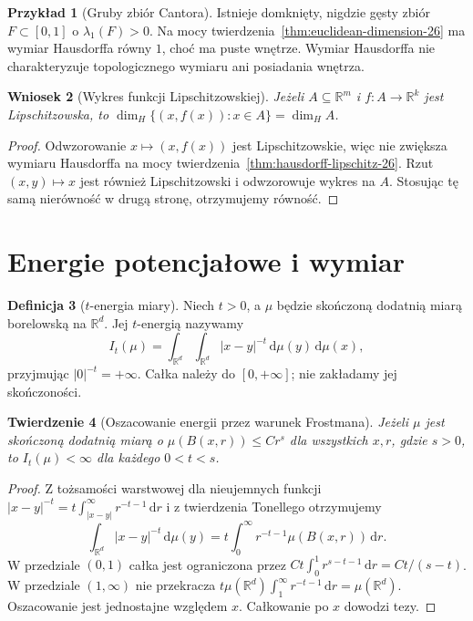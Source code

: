 \documentclass[11pt,a4paper,oneside]{book}
\numberwithin{equation}{chapter}
\theoremstyle{plain}
\newtheorem{twierdzenie}{Twierdzenie}[chapter]
\newtheorem{wniosek}[twierdzenie]{Wniosek}
\theoremstyle{definition}
\newtheorem{definicja}[twierdzenie]{Definicja}
\newtheorem{przyklad}[twierdzenie]{Przykład}
\theoremstyle{remark}
\begin{document}
\begin{przyklad}[Gruby zbiór Cantora]
Istnieje domknięty, nigdzie gęsty zbiór
$F\subset[0,1]$ o $\lambda_1(F)>0$.
Na mocy twierdzenia~\ref{thm:euclidean-dimension-26}
ma wymiar Hausdorffa równy $1$, choć ma puste wnętrze.
Wymiar Hausdorffa nie charakteryzuje topologicznego
wymiaru ani posiadania wnętrza.
\end{przyklad}

\begin{wniosek}[Wykres funkcji Lipschitzowskiej]
\label{cor:graph-dimension-26}
Jeżeli $A\subseteq\mathbb R^m$ i
$f:A\to\mathbb R^k$ jest Lipschitzowska, to
$\dim_H\{(x,f(x)):x\in A\}=\dim_HA$.
\end{wniosek}
\begin{proof}
Odwzorowanie $x\mapsto(x,f(x))$ jest Lipschitzowskie,
więc nie zwiększa wymiaru Hausdorffa na mocy
twierdzenia~\ref{thm:hausdorff-lipschitz-26}.
Rzut $(x,y)\mapsto x$ jest również Lipschitzowski
i odwzorowuje wykres na $A$. Stosując tę samą
nierówność w drugą stronę, otrzymujemy równość.
\end{proof}

\section{Energie potencjałowe i wymiar}
\begin{definicja}[$t$-energia miary]
\label{def:energy-26}
Niech $t>0$, a $\mu$ będzie skończoną dodatnią miarą
borelowską na $\mathbb R^d$. Jej $t$-energią nazywamy
\[
 I_t(\mu)=\int_{\mathbb R^d}\!\int_{\mathbb R^d}
 |x-y|^{-t}\,\mathrm d\mu(y)\,\mathrm d\mu(x),
\]
przyjmując $|0|^{-t}=+\infty$. Całka należy do
$[0,+\infty]$; nie zakładamy jej skończoności.
\end{definicja}

\begin{twierdzenie}[Oszacowanie energii przez warunek Frostmana]
\label{thm:frostman-energy-26}
Jeżeli $\mu$ jest skończoną dodatnią miarą o
$\mu(B(x,r))\le Cr^s$ dla wszystkich $x,r$,
gdzie $s>0$, to $I_t(\mu)<\infty$ dla każdego
$0<t<s$.
\end{twierdzenie}
\begin{proof}
Z tożsamości warstwowej dla nieujemnych funkcji
$|x-y|^{-t}=t\int_{|x-y|}^{\infty}r^{-t-1}\,\mathrm dr$
i z twierdzenia Tonellego otrzymujemy
\[
 \int_{\mathbb R^d}|x-y|^{-t}\,\mathrm d\mu(y)
 =t\int_0^\infty r^{-t-1}\mu(B(x,r))\,\mathrm dr.
\]
W przedziale $(0,1)$ całka jest ograniczona przez
$Ct\int_0^1r^{s-t-1}\,\mathrm dr=Ct/(s-t)$.
W przedziale $(1,\infty)$ nie przekracza
$t\mu(\mathbb R^d)\int_1^\infty r^{-t-1}\,\mathrm dr
=\mu(\mathbb R^d)$. Oszacowanie jest jednostajne
względem $x$. Całkowanie po $x$ dowodzi tezy.
\end{proof}
\end{document}
